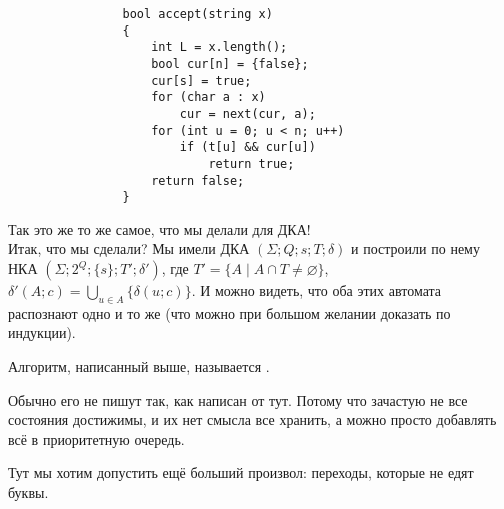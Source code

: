 \documentclass{article}
\begin{document}
\begin{itemize}
\begin{Proof}
\begin{verbatim}
                bool accept(string x)
                {
                    int L = x.length();
                    bool cur[n] = {false};
                    cur[s] = true;
                    for (char a : x)
                        cur = next(cur, a);
                    for (int u = 0; u < n; u++)
                        if (t[u] && cur[u])
                            return true;
                    return false;
                }
            \end{verbatim}
            Так это же то же самое, что мы делали для ДКА!\\
            Итак, что мы сделали? Мы имели ДКА $(\Sigma;Q;s;T;\delta)$ и построили по нему НКА $(\Sigma;2^Q;\{s\};T';\delta')$, где $T'=\{A\mid A\cap T\neq\varnothing\}$, $\delta'(A;c)=\bigcup\limits_{u\in A}\{\delta(u;c)\}$. И можно видеть, что оба этих автомата распознают одно и то же (что можно при большом желании доказать по индукции).
        \end{Proof}
        \dfn Алгоритм, написанный выше, называется .
        \begin{Comment}
            Обычно его не пишут так, как написан от тут. Потому что зачастую не все состояния достижимы, и их нет смысла все хранить, а можно просто добавлять всё в приоритетную очередь.
        \end{Comment}
        \begin{Comment}
            Тут мы хотим допустить ещё больший произвол: переходы, которые не едят буквы.
            \begin{figure}[H]
\end{figure}
\end{Comment}
\end{itemize}
\end{document}
